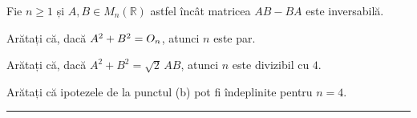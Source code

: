 Fie $n\ge1$ și $A,B\in M_n(\mathbb{R})$ astfel încât matricea $AB-BA$ este inversabilă.
\begin{parti}
  \item Arătați că, dacă $A^2+B^2=O_n$, atunci $n$ este par.
  \item Arătați că, dacă $A^2+B^2=\sqrt2\,AB$, atunci $n$ este divizibil cu $4$.
  \item Arătați că ipotezele de la punctul (b) pot fi îndeplinite pentru $n=4$.
\end{parti}
\vspace{1mm}\hrule
